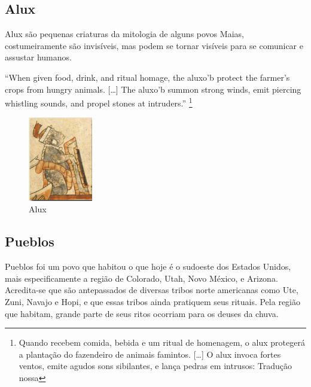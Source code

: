 \clearpage


\subsection{Alux}

Alux são pequenas criaturas da mitologia de alguns povos Maias, costumeiramente
são invisíveis, mas podem se tornar visíveis para se comunicar e assustar
humanos. 

\begin{citacao}
``When given food, drink, and ritual homage, the aluxo'b protect the farmer’s crops from hungry animals. [\ldots] The aluxo'b summon strong winds, emit piercing whistling sounds, and propel stones at intruders.'' 
\cite{storniolo2009out} \footnote{Quando recebem comida, bebida e
um ritual de homenagem, o alux protegerá a plantação do fazendeiro de
animais famintos. [\ldots] O alux invoca fortes ventos, emite agudos sons
sibilantes, e lança pedras em intrusos: Tradução nossa}
\end{citacao}


\begin{figure}[!htb] \caption{\label{fig_alux}Alux} \begin{center}
\includegraphics[width=0.25\textwidth]{imagens/alux.jpg} \end{center}
 \end{figure}

\clearpage

\subsection{Pueblos}

Pueblos foi  um povo que habitou o que hoje é o sudoeste dos Estados Unidos, mais especificamente a região de Colorado, Utah, Novo México, e Arizona.\cite{civPerdidas2017,lyneis1995virgin} Acredita-se que são antepassados de diversas tribos norte americanas como Ute, Zuni, Navajo e Hopi, e que essas tribos ainda pratiquem seus rituais. Pela região que habitam, grande parte de seus ritos ocorriam para os deuses da chuva\cite{abreu94}.

